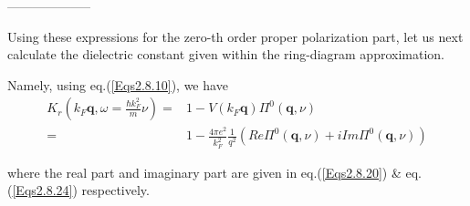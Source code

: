 \begin{center}--------------------\end{center}

Using these expressions for the zero-th order proper polarization part, let us next calculate the dielectric constant given within the ring-diagram approximation.

Namely, using eq.(\ref{Eqs2.8.10}), we have
\begin{equation} \label{Eqs2.8.28} \begin{split}
K_r(k_F \mathbf{q}, \omega= \frac{\hbar k_F^2}{m}\nu) =& 1- V(k_F \mathbf{q}) \Pi^0(\mathbf{q},\nu)\\
=& 1- \frac{4\pi e^2}{k_F^2}\frac{1}{q^2} \left( Re\Pi^0(\mathbf{q},\nu)+i Im\Pi^0(\mathbf{q},\nu) \right)
\end{split}\end{equation}

where the real part and imaginary part are given in eq.(\ref{Eqs2.8.20}) \& eq.(\ref{Eqs2.8.24}) respectively.


